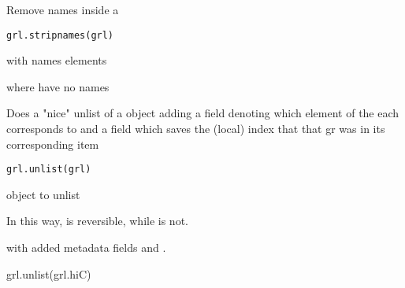 \documentclass[a4paper]{book}
\begin{document}
%
\begin{Description}\relax
Remove  names inside a 
\end{Description}
%
\begin{Usage}
\begin{verbatim}
grl.stripnames(grl)
\end{verbatim}
\end{Usage}
%
\begin{Arguments}
\begin{ldescription}
\item[\code{grl}]  with names elements
\end{ldescription}
\end{Arguments}
%
\begin{Value}
 where  have no names
\end{Value}
%
\begin{Description}\relax
Does a "nice" unlist of a  object adding a field  denoting which element of the 
each  corresponds to and a field  which saves the (local) index that that gr was in its corresponding  item
\end{Description}
%
\begin{Usage}
\begin{verbatim}
grl.unlist(grl)
\end{verbatim}
\end{Usage}
%
\begin{Arguments}
\begin{ldescription}
\item[\code{grl}]  object to unlist
\end{ldescription}
\end{Arguments}
%
\begin{Details}\relax
In this way,  is reversible, while  is not.
\end{Details}
%
\begin{Value}
 with added metadata fields  and .
\end{Value}
%
\begin{Examples}
\begin{ExampleCode}
grl.unlist(grl.hiC)
\end{ExampleCode}
\end{Examples}
\end{document}
